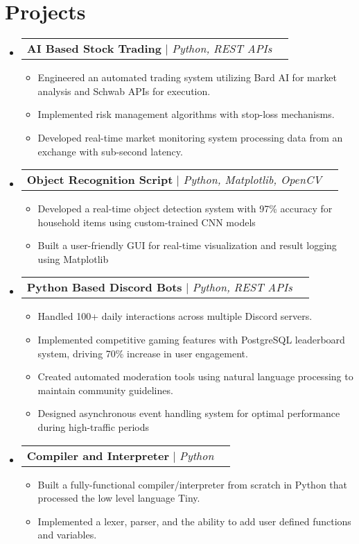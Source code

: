 \documentclass[letterpaper,11pt]{article}
\makeatletter
\newcommand{\resumeItem}[1]{
  \item\small{
    {#1 \vspace{-2pt}}
  }
}
\newcommand{\resumeProjectHeading}[2]{
    \item
    \begin{tabular*}{0.97\textwidth}{l@{\extracolsep{\fill}}r}
      \small#1 & #2 \\
    \end{tabular*}\vspace{-7pt}
}
\newcommand{\resumeSubHeadingListStart}{\begin{itemize}[leftmargin=0.15in, label={}]}
\newcommand{\resumeSubHeadingListEnd}{\end{itemize}}
\newcommand{\resumeItemListStart}{\begin{itemize}}
\newcommand{\resumeItemListEnd}{\end{itemize}\vspace{-5pt}}
\makeatother
\begin{document}
\section{Projects}
\resumeSubHeadingListStart
\resumeProjectHeading
    {\textbf{AI Based Stock Trading} $|$ \emph{Python, REST APIs}}{}
      \resumeItemListStart
        \resumeItem{Engineered an automated trading system utilizing Bard AI for market analysis and Schwab APIs for execution.}
        \resumeItem{Implemented risk management algorithms with stop-loss mechanisms.}
        \resumeItem{Developed real-time market monitoring system processing data from an exchange with sub-second latency.}
      \resumeItemListEnd
\resumeProjectHeading
    {\textbf{Object Recognition Script} $|$ \emph{Python, Matplotlib, OpenCV}}{}
      \resumeItemListStart
        \resumeItem{Developed a real-time object detection system with 97\% accuracy for household items using custom-trained CNN models}
        \resumeItem{Built a user-friendly GUI for real-time visualization and result logging using Matplotlib}
      \resumeItemListEnd
\resumeProjectHeading
    {\textbf{Python Based Discord Bots} $|$ \emph{Python, REST APIs}}{}
      \resumeItemListStart
        \resumeItem{Handled 100+ daily interactions across multiple Discord servers.}
        \resumeItem{Implemented competitive gaming features with PostgreSQL leaderboard system, driving 70\% increase in user engagement.}
        \resumeItem{Created automated moderation tools using natural language processing to maintain community guidelines.}
        \resumeItem{Designed asynchronous event handling system for optimal performance during high-traffic periods}
      \resumeItemListEnd
\resumeProjectHeading
    {\textbf{Compiler and Interpreter} $|$ \emph{Python}}{}
      \resumeItemListStart
        \resumeItem{Built a fully-functional compiler/interpreter from scratch in Python that processed the low level language Tiny.}
        \resumeItem{Implemented a lexer, parser, and the ability to add user defined functions and variables.}
      \resumeItemListEnd

\resumeSubHeadingListEnd


\end{document}
